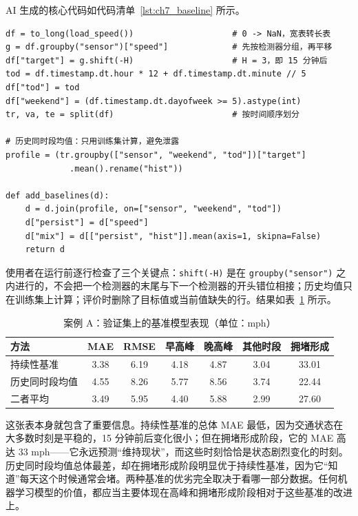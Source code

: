 AI 生成的核心代码如代码清单~\ref{lst:ch7_baseline} 所示。

\begin{lstlisting}[caption={案例 A：三个基准模型的实现（节选）},label={lst:ch7_baseline}]
df = to_long(load_speed())                    # 0 -> NaN，宽表转长表
g = df.groupby("sensor")["speed"]             # 先按检测器分组，再平移
df["target"] = g.shift(-H)                    # H = 3，即 15 分钟后
tod = df.timestamp.dt.hour * 12 + df.timestamp.dt.minute // 5
df["tod"] = tod
df["weekend"] = (df.timestamp.dt.dayofweek >= 5).astype(int)
tr, va, te = split(df)                        # 按时间顺序划分

# 历史同时段均值：只用训练集计算，避免泄露
profile = (tr.groupby(["sensor", "weekend", "tod"])["target"]
             .mean().rename("hist"))

def add_baselines(d):
    d = d.join(profile, on=["sensor", "weekend", "tod"])
    d["persist"] = d["speed"]
    d["mix"] = d[["persist", "hist"]].mean(axis=1, skipna=False)
    return d
\end{lstlisting}

使用者在运行前逐行检查了三个关键点：\texttt{shift(-H)} 是在 \texttt{groupby("sensor")} 之内进行的，不会把一个检测器的末尾与下一个检测器的开头错位相接；历史均值只在训练集上计算；评价时删除了目标值或当前值缺失的行。结果如表~\ref{tab:ch7_baseline} 所示。

\begin{table}[H]
\centering
\caption{案例 A：验证集上的基准模型表现（单位：mph）}
\label{tab:ch7_baseline}
\begin{tabular}{lcccccc}
\toprule
方法 & MAE & RMSE & 早高峰 & 晚高峰 & 其他时段 & 拥堵形成 \\
\midrule
持续性基准 & 3.38 & 6.19 & 4.18 & 4.87 & 3.04 & 33.01 \\
历史同时段均值 & 4.55 & 8.26 & 5.77 & 8.56 & 3.74 & 22.44 \\
二者平均 & 3.49 & 5.95 & 4.40 & 5.88 & 2.99 & 27.60 \\
\bottomrule
\end{tabular}
\end{table}

这张表本身就包含了重要信息。持续性基准的总体 MAE 最低，因为交通状态在大多数时刻是平稳的，15 分钟前后变化很小；但在拥堵形成阶段，它的 MAE 高达 33 mph——它永远预测“维持现状”，而这些时刻恰恰是状态剧烈变化的时刻。历史同时段均值总体最差，却在拥堵形成阶段明显优于持续性基准，因为它“知道”每天这个时候通常会堵。两种基准的优劣完全取决于看哪一部分数据。任何机器学习模型的价值，都应当主要体现在高峰和拥堵形成阶段相对于这些基准的改进上。

